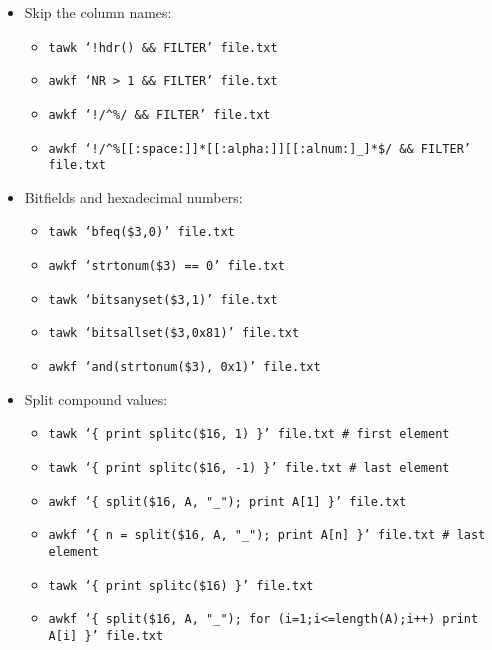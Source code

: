 \documentclass[documentation]{subfiles}
\begin{document}
\begin{itemize}
    \item Skip the column names:
        \begin{itemize}
            \item {\tt tawk `!hdr() \&\& FILTER' file.txt}
            \item {\tt awkf `NR > 1 \&\& FILTER' file.txt}
            \item {\tt awkf `!/\textasciicircum{}\%/ \&\& FILTER' file.txt}
            \item {\tt awkf `!/\textasciicircum{}\%[[:space:]]*[[:alpha:]][[:alnum:]\_]*\$/ \&\& FILTER' file.txt}
        \end{itemize}

    \item Bitfields and hexadecimal numbers:
        \begin{itemize}
            \item {\tt tawk `bfeq(\$3,0)' file.txt}
            \item {\tt awkf `strtonum(\$3) == 0' file.txt}
            \item {\tt tawk `bitsanyset(\$3,1)' file.txt}
            \item {\tt tawk `bitsallset(\$3,0x81)' file.txt}
            \item {\tt awkf `and(strtonum(\$3), 0x1)' file.txt}
        \end{itemize}

    \item Split compound values:
        \begin{itemize}
            \item {\tt tawk `\{ print splitc(\$16, 1) \}' file.txt \# first element}
            \item {\tt tawk `\{ print splitc(\$16, -1) \}' file.txt \# last element}
            \item {\tt awkf `\{ split(\$16, A, "\_"); print A[1] \}' file.txt}
            \item {\tt awkf `\{ n = split(\$16, A, "\_"); print A[n] \}' file.txt \# last element}
            \item {\tt tawk `\{ print splitc(\$16) \}' file.txt}
            \item {\tt awkf `\{ split(\$16, A, "\_"); for (i=1;i<=length(A);i++) print A[i] \}' file.txt}
        \end{itemize}


\end{itemize}
\end{document}
